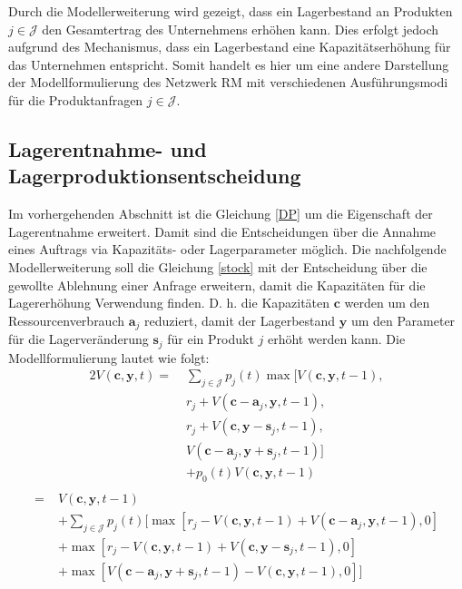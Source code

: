 Durch die Modellerweiterung wird gezeigt, dass ein Lagerbestand an Produkten $j\in\mathcal{J}$ den Gesamtertrag des Unternehmens erhöhen kann. Dies erfolgt jedoch aufgrund des Mechanismus, dass ein Lagerbestand eine Kapazitätserhöhung für das Unternehmen entspricht. Somit handelt es hier um eine andere Darstellung der Modellformulierung des Netzwerk RM mit verschiedenen Ausführungsmodi für die Produktanfragen $j\in\mathcal{J}$. %

\subsection{Lagerentnahme- und Lagerproduktionsentscheidung}

Im vorhergehenden Abschnitt ist die Gleichung \eqref{DP} um die Eigenschaft der Lagerentnahme erweitert. Damit sind die Entscheidungen über die Annahme eines Auftrags via Kapazitäts- oder Lagerparameter möglich. Die nachfolgende Modellerweiterung soll die Gleichung \eqref{stock} mit der Entscheidung über die gewollte Ablehnung einer Anfrage erweitern, damit die Kapazitäten für die Lagererhöhung Verwendung finden. D. h. die Kapazitäten $\textbf{c}$ werden um den Ressourcenverbrauch $\textbf{a}_{j}$ reduziert, damit der Lagerbestand $\textbf{y}$ um den Parameter für die Lagerveränderung $\textbf{s}_{j}$ für ein Produkt $j$ erhöht werden kann. Die Modellformulierung lautet wie folgt:
\begin{alignat*}{2}
V(\textbf{c}, \textbf{y}, t) =\;& \sum_{j \in \mathcal{J}}p_{j}(t)\max[V(\textbf{c}, \textbf{y}, t-1),\\
&r_{j} + V(\textbf{c}-\textbf{a}_j, \textbf{y}, t-1),\\
&r_{j} + V(\textbf{c}, \textbf{y}-\textbf{s}_j, t-1),\\
&V(\textbf{c}-\textbf{a}_j, \textbf{y}+\textbf{s}_j, t-1)]\\
&+ p_{0}(t)V(\textbf{c}, \textbf{y}, t-1) \\
\end{alignat*}
\begin{equation}\label{storage}
\begin{alignat*}{2}
= \;& V(\textbf{c}, \textbf{y}, t-1)\\
&+ \sum_{j \in \mathcal{J}}p_{j}(t)[\max[r_{j} - V(\textbf{c}, \textbf{y}, t-1) + V(\textbf{c}-\textbf{a}_j, \textbf{y}, t-1),0] \\
&+ \max[r_{j} - V(\textbf{c}, \textbf{y}, t-1) + V(\textbf{c}, \textbf{y}-\textbf{s}_j, t-1),0]\\
&+ \max[V(\textbf{c}-\textbf{a}_j, \textbf{y}+\textbf{s}_j, t-1) - V(\textbf{c}, \textbf{y}, t-1) ,0]]\\
\end{alignat*}
\end{equation}

